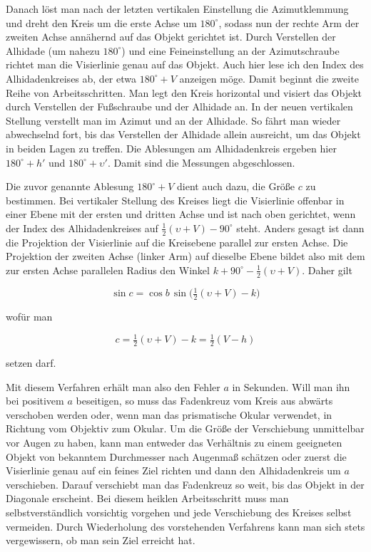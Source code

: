 \par\indent Danach löst man nach der letzten vertikalen Einstellung die Azimutklemmung und dreht den Kreis um die erste Achse um $180^\circ$, sodass nun der rechte Arm der zweiten Achse annähernd auf das Objekt gerichtet ist. Durch Verstellen der Alhidade (um nahezu $180^\circ$) und eine Feineinstellung an der Azimutschraube richtet man die Visierlinie genau auf das Objekt. Auch hier lese ich den Index des Alhidadenkreises ab, der etwa $180^\circ+V$ anzeigen möge. Damit beginnt die zweite Reihe von Arbeitsschritten. Man legt den Kreis horizontal und visiert das Objekt durch Verstellen der Fußschraube und der Alhidade an. In der neuen vertikalen Stellung verstellt man im Azimut und an der Alhidade. So fährt man wieder abwechselnd fort, bis das Verstellen der Alhidade allein ausreicht, um das Objekt in beiden Lagen zu treffen. Die Ablesungen am Alhidadenkreis ergeben hier $180^\circ+h'$ und $180^\circ+\upsilon'$. Damit sind die Messungen abgeschlossen.

\par\indent Die zuvor genannte Ablesung $180^\circ+V$ dient auch dazu, die Größe $c$ zu bestimmen. Bei vertikaler Stellung des Kreises liegt die Visierlinie offenbar in einer Ebene mit der ersten und dritten Achse und ist nach oben gerichtet, wenn der Index des Alhidadenkreises auf $\tfrac{1}{2}(\upsilon+V)-90^\circ$ steht. Anders gesagt ist dann die Projektion der Visierlinie auf die Kreisebene parallel zur ersten Achse. Die Projektion der zweiten Achse (linker Arm) auf dieselbe Ebene bildet also mit dem zur ersten Achse parallelen Radius den Winkel $k+90^\circ-\tfrac{1}{2}(\upsilon+V)$. Daher gilt

\[ \sin c = \cos b\,\sin\bigl(\tfrac{1}{2}(\upsilon+V)-k\bigr) \]

\noindent wofür man

\[ c = \tfrac{1}{2}(\upsilon+V)-k = \tfrac{1}{2}(V-h) \]

\noindent setzen darf.

\par\indent Mit diesem Verfahren erhält man also den Fehler $a$ in Sekunden. Will man ihn bei positivem $a$ beseitigen, so muss das Fadenkreuz vom Kreis aus abwärts verschoben werden oder, wenn man das prismatische Okular verwendet, in Richtung vom Objektiv zum Okular. Um die Größe der Verschiebung unmittelbar vor Augen zu haben, kann man entweder das Verhältnis zu einem geeigneten Objekt von bekanntem Durchmesser nach Augenmaß schätzen oder zuerst die Visierlinie genau auf ein feines Ziel richten und dann den Alhidadenkreis um $a$ verschieben. Darauf verschiebt man das Fadenkreuz so weit, bis das Objekt in der Diagonale erscheint. Bei diesem heiklen Arbeitsschritt muss man selbstverständlich vorsichtig vorgehen und jede Verschiebung des Kreises selbst vermeiden. Durch Wiederholung des vorstehenden Verfahrens kann man sich stets vergewissern, ob man sein Ziel erreicht hat.

